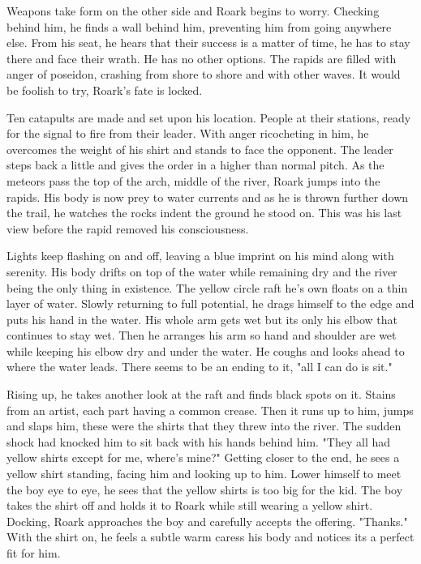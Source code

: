         Weapons take form on the other side and Roark begins to worry. Checking behind him, he finds a wall behind him, preventing him from 
    going anywhere else. From his seat, he hears that their success is a matter of time, he has to stay there and face their wrath. He has no
    other options. The rapids are filled with anger of poseidon, crashing from shore to shore and with other waves. It would be foolish to try,
    Roark's fate is locked.

        Ten catapults are made and set upon his location. People at their stations, ready for the signal to fire from their leader. With anger
    ricocheting in him, he overcomes the weight of his shirt and stands to face the opponent. The leader steps back a little and gives the order
    in a higher than normal pitch. As the meteors pass the top of the arch, middle of the river, Roark jumps into the rapids. His body is now
    prey to water currents and as he is thrown further down the trail, he watches the rocks indent the ground he stood on. This was his last view
    before the rapid removed his consciousness.

       Lights keep flashing on and off, leaving a blue imprint on his mind along with serenity. His body drifts on top of the water while 
    remaining dry and the river being the only thing in existence. The yellow circle raft he's own floats on a thin layer of water. Slowly 
    returning to full potential, he drags himself to the edge and puts his hand in the water. His whole arm gets wet but its only his elbow
    that continues to stay wet. Then he arranges his arm so hand and shoulder are wet while keeping his elbow dry and under the water. He coughs
    and looks ahead to where the water leads. There seems to be an ending to it, "all I can do is sit."

        Rising up, he takes another look at the raft and finds black spots on it. Stains from an artist, each part having a common crease. Then
    it runs up to him, jumps and slaps him, these were the shirts that they threw into the river. The sudden shock had knocked him to sit back 
    with his hands behind him. "They all had yellow shirts except for me, where's mine?" Getting closer to the end, he sees a yellow shirt 
    standing, facing him and looking up to him. Lower himself to meet the boy eye to eye, he sees that the yellow shirts is too big for the kid.
    The boy takes the shirt off and holds it to Roark while still wearing a yellow shirt. Docking, Roark approaches the boy and carefully 
    accepts the offering. "Thanks." With the shirt on, he feels a subtle warm caress his body and notices its a perfect fit for him.

